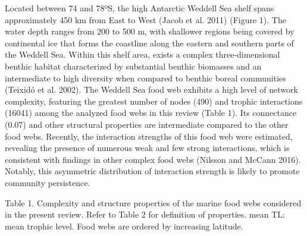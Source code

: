 \documentclass[
]{article}
\begin{document}
Located between 74 and 78ºS, the high Antarctic Weddell Sea shelf spans
approximately 450 km from East to West (Jacob et al. 2011) (Figure 1).
The water depth ranges from 200 to 500 m, with shallower regions being
covered by continental ice that forms the coastline along the eastern
and southern parts of the Weddell Sea. Within this shelf area, exists a
complex three-dimensional benthic habitat characterized by substantial
benthic biomasses and an intermediate to high diversity when compared to
benthic boreal communities (Teixidó et al. 2002). The Weddell Sea food
web exhibits a high level of network complexity, featuring the greatest
number of nodes (490) and trophic interactions (16041) among the
analyzed food webs in this review (Table 1). Its connectance (0.07) and
other structural properties are intermediate compared to the other food
webs. Recently, the interaction strengths of this food web were
estimated, revealing the presence of numerous weak and few strong
interactions, which is consistent with findings in other complex food
webs (Nilsson and McCann 2016). Notably, this asymmetric distribution of
interaction strength is likely to promote community persistence.

\newpage
\footnotesize

Table 1. Complexity and structure properties of the marine food webs
considered in the present review. Refer to Table 2 for definition of
properties. mean TL: mean trophic level. Food webs are ordered by
increasing latitude.
\end{document}
